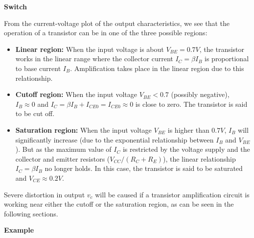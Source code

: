 {\bf Switch}

From the current-voltage plot of the output characteristics, we see that
the operation of a transistor can be in one of the three possible regions:
\begin{itemize}
\item {\bf Linear region:} When the input voltage is about $V_{BE}=0.7V$,
the transistor works in the linear range where the collector current 
$I_C=\beta I_B$ is proportional to base current $I_B$. Amplification 
takes place in the linear region due to this relationship.
\item {\bf Cutoff region:} When the input voltage $V_{BE}<0.7$ (possibly
negative), $I_B\approx 0$ and $I_C=\beta I_B+I_{CE0}=I_{CE0}\approx 0$ 
is close to zero. The transistor is said to be cut off. 
\item {\bf Saturation region:} When the input voltage $V_{BE}$ is higher 
than $0.7V$, $I_B$ will significantly increase (due to the exponential
relationship between $I_B$ and $V_{BE}$). But as the maximum value of
$I_C$ is restricted by the voltage supply and the collector and emitter
resistors ($V_{CC}/(R_C+R_E)$), the linear relationship $I_C=\beta I_B$
no longer holds. In this case, the transistor is said to be saturated
and $V_{CE}\approx 0.2V$.
\end{itemize}
Severe distortion in output $v_c$ will be caused if a transistor 
amplification circuit is working near either the cutoff or the
saturation region, as can be seen in the following sections.



{\bf Example}

